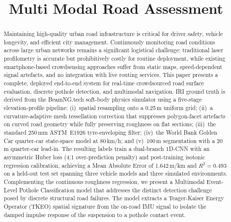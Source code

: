 \documentclass[conference]{IEEEtran}
\begin{document}
\title{Multi Modal Road Assessment}

\author{
}

\maketitle

\begin{abstract}
Maintaining high-quality urban road infrastructure is critical for driver safety, vehicle longevity, and efficient city management.
Continuously monitoring road conditions across large urban networks remains a significant logistical challenge: traditional laser profilometry is accurate but prohibitively costly for routine deployment, while existing smartphone-based crowdsensing approaches suffer from static maps, speed-dependent signal artefacts, and no integration with live routing services.
This paper presents a complete, deployed end-to-end system for real-time crowdsourced road surface evaluation, discrete pothole detection, and multimodal navigation.
IRI ground truth is derived from the BeamNG.tech soft-body physics simulator using a five-stage elevation-profile pipeline: (i)~spatial resampling onto a 0.25\,m uniform grid;
(ii)~a curvature-adaptive mesh tessellation correction that suppresses polygon-facet artefacts on curved road geometry while fully preserving roughness on flat sections;
(iii)~the standard 250\,mm ASTM~E1926 tyre-enveloping filter; (iv)~the World Bank Golden Car quarter-car state-space model at 80\,km/h;
and (v)~100\,m segmentation with a 20\,m quarter-car lead-in. The resulting labels train a dual-branch 1D-CNN with an asymmetric Huber loss (4:1 over-prediction penalty) and post-training isotonic regression calibration, achieving a Mean Absolute Error of 1.642\,m/km and $R^{2} = 0.493$ on a held-out test set spanning three vehicle models and three simulated environments.
Complementing the continuous roughness regression, we present a Multimodal Event-Level Pothole Classification model that addresses the distinct detection challenge posed by discrete structural road failures.
The model extracts a Teager-Kaiser Energy Operator (TKEO) spatial signature from the on-road IMU signal to isolate the damped impulse response of the suspension to a pothole contact event.

\end{abstract}
\end{document}
